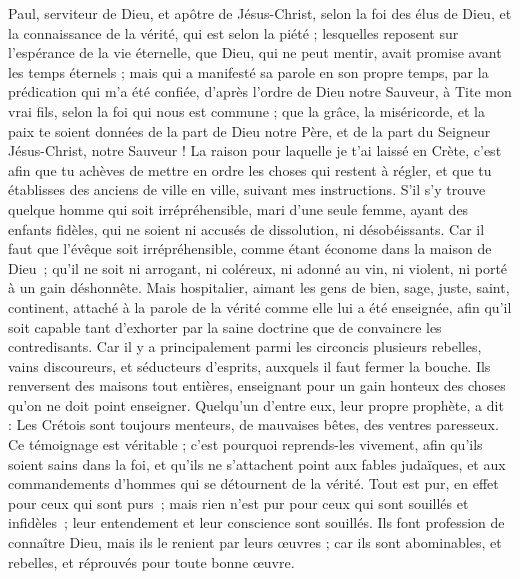 \BFont
\begin{multicols}{2}
\TextTitle{[Introductions]}
\VerseOne{}Paul, serviteur de Dieu, et apôtre de Jésus-Christ, selon la foi des élus de Dieu, et la connaissance de la vérité, qui est selon la piété ;
lesquelles reposent sur l'espérance de la vie éternelle, que Dieu, qui ne peut mentir, avait promise avant les temps éternels ;
mais qui a manifesté sa parole en son propre temps, par la prédication qui m’a été confiée, d’après l’ordre de Dieu notre Sauveur,
à Tite mon vrai fils, selon la foi qui nous est commune ; que la grâce, la miséricorde, et la paix te soient données de la part de Dieu notre Père, et de la part du Seigneur Jésus-Christ, notre Sauveur !
La raison pour laquelle je t'ai laissé en Crète, c'est afin que tu achèves de mettre en ordre les choses qui restent à régler, et que tu établisses des anciens de ville en ville, suivant mes instructions.
S’il s’y trouve quelque homme qui soit irrépréhensible, mari d'une seule femme, ayant des enfants fidèles, qui ne soient ni accusés de dissolution, ni désobéissants.
Car il faut que l'évêque soit irrépréhensible, comme étant économe dans la maison de Dieu ; qu’il ne soit ni arrogant, ni coléreux, ni adonné au vin, ni violent, ni porté à un gain déshonnête.
Mais hospitalier, aimant les gens de bien, sage, juste, saint, continent,
attaché à la parole de la vérité comme elle lui a été enseignée, afin qu'il soit capable tant d'exhorter par la saine doctrine que de convaincre les contredisants.
Car il y a principalement parmi les circoncis plusieurs rebelles, vains discoureurs, et séducteurs d'esprits,
auxquels il faut fermer la bouche. Ils renversent des maisons tout entières, enseignant pour un gain honteux des choses qu'on ne doit point enseigner.
Quelqu'un d'entre eux, leur propre prophète, a dit : Les Crétois sont toujours menteurs, de mauvaises bêtes, des ventres paresseux.
Ce témoignage est véritable ; c'est pourquoi reprends-les vivement, afin qu'ils soient sains dans la foi,
et qu’ils ne s’attachent point aux fables judaïques, et aux commandements d’hommes qui se détournent de la vérité.
Tout est pur, en effet pour ceux qui sont purs ; mais rien n'est pur pour ceux qui sont souillés et infidèles ; leur entendement et leur conscience sont souillés.
Ils font profession de connaître Dieu, mais ils le renient par leurs œuvres ; car ils sont abominables, et rebelles, et réprouvés pour toute bonne œuvre.

\end{multicols}
